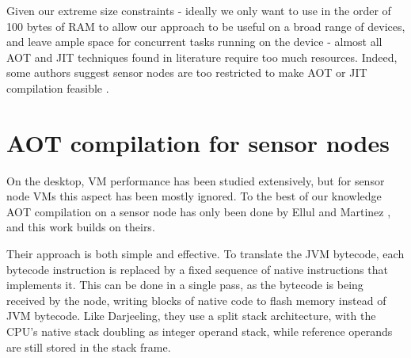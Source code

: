 Given our extreme size constraints - ideally we only want to use in the order of 100 bytes of RAM to allow our approach to be useful on a broad range of devices, and leave ample space for concurrent tasks running on the device - almost all AOT and JIT techniques found in literature require too much resources. Indeed, some authors suggest sensor nodes are too restricted to make AOT or JIT compilation feasible \cite{Aslam:2011thesis, Wirjawan:2008}.

\section{AOT compilation for sensor nodes}
\label{sec-state-of-the-art-elluls-aot}
On the desktop, VM performance has been studied extensively, but for sensor node VMs this aspect has been mostly ignored. To the best of our knowledge AOT compilation on a sensor node has only been done by Ellul and Martinez \cite{Ellul:2010iw, Ellul:2012thesis}, and this work builds on theirs.

Their approach is both simple and effective. To translate the JVM bytecode, each bytecode instruction is replaced by a fixed sequence of native instructions that implements it. This can be done in a single pass, as the bytecode is being received by the node, writing blocks of native code to flash memory instead of JVM bytecode. Like Darjeeling, they use a split stack architecture, with the CPU's native stack doubling as integer operand stack, while reference operands are still stored in the stack frame.

